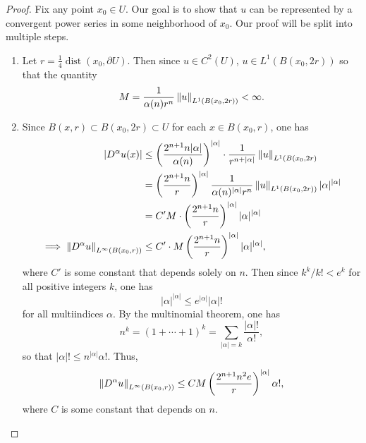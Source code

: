 \documentclass{article}
\begin{document}
\begin{itemize}
		\begin{proof}
			Fix any point $x_{0} \in U$. Our goal is to show that $u$ can be represented by a convergent power series in some neighborhood of $x_{0}$. Our proof will be split into multiple steps. 
			\begin{enumerate}[itemsep =-2pt,label = (\arabic{*})]
				\item Let $r = \frac{1}{4}\operatorname{dist}(x_{0}, \partial U)$. Then since $u \in C^{2}(U)$, $u \in L^{1}(B(x_{0}, 2r))$ so that the quantity 
				\begin{equation*}
					M = \frac{1}{\alpha(n)r^{n}}\left\Vert u \right\Vert_{L^{1}(B(x_{0}, 2r))} < \infty. 
				\end{equation*}
				\item Since $B(x, r) \subset B(x_{0}, 2r) \subset U$ for each $x \in B(x_{0}, r)$, one has 
				\begin{align*}
					\begin{split}
						|D^{\alpha}u(x)| &\leq \left(\frac{2^{n + 1}n |\alpha|}{\alpha(n)}\right)^{|\alpha|} \cdot \frac{1}{r^{n + |\alpha|}}\left\Vert u \right\Vert_{L^{1}(B(x_{0},2r)} \\
						&= \left(\frac{2^{n + 1}n}{r}\right)^{|\alpha|}\frac{1}{\alpha(n)^{|\alpha|}r^{n}}\left\Vert u \right\Vert_{L^{1}(B(x_{0}, 2r))}|\alpha|^{|\alpha|} \\
						&= C' M \cdot \left(\frac{2^{n + 1}n}{r}\right)^{|\alpha|}|\alpha|^{|\alpha|} \\
						\implies \left\Vert D^{\alpha}u \right\Vert_{L^{\infty}(B(x_{0}, r))} &\leq C'\cdot M \left(\frac{2^{n + 1}n}{r}\right)^{|\alpha|}|\alpha|^{|\alpha|}, 
					\end{split}
				\end{align*}
				where $C'$ is some constant that depends solely on $n$. Then since $k^{k}/k! < e^{k}$ for all positive integers $k$, one has 
				\begin{equation*}
					|\alpha|^{|\alpha|} \leq e^{|\alpha|}|\alpha|!
				\end{equation*}
				for all multiindices $\alpha$. By the multinomial theorem, one has 
				\begin{equation*}
					n^{k} = (1 +\dotsm + 1)^{k} = \sum_{|\alpha| = k}\frac{|\alpha|!}{\alpha!}, 
				\end{equation*}
				so that $|\alpha|! \leq n^{|\alpha|}\alpha!$. Thus, 
				\begin{equation*}
					\left\Vert D^{\alpha}u \right\Vert_{L^{\infty}(B(x_{0}, r))} \leq CM\left(\frac{2^{n + 1}n^{2}e}{r}\right)^{|\alpha|}\alpha!, 
				\end{equation*}
				where $C$ is some constant that depends on $n$. 
				

\end{enumerate}
\end{proof}
\end{itemize}
\end{document}
